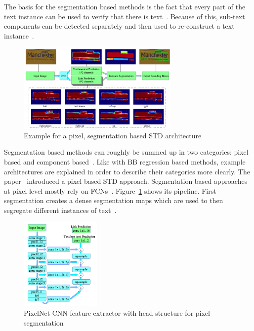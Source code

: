 The basis for the segmentation based methods is the fact that every part of the text instance can
be used to verify that there is text~\citep{long_scene_2021}.
Because of this, sub-text components can be detected separately and then used to re-construct a text
instance~\citep{long_scene_2021}.
\begin{figure}[ht]
    \centering
    \includegraphics[width=0.7\textwidth]{img/STD-seg-based-architecture-Deng-PixelLink-2018.png}
    \caption[Pixel, segmentation based STD architecture]{%
        Example for a pixel, segmentation based STD
        architecture~\citep{deng_pixellink_2018}\label{fig:STD-segbased-pixel-architecture}
    }
\end{figure}
Segmentation based methods can roughly be summed up in two categories: pixel based and component
based~\citep{long_scene_2021}.
Like with \ac{BB} regression based methods, example architectures are explained in order to
describe their categories more clearly.
The paper~\cite{deng_pixellink_2018} introduced a pixel based \ac{STD} approach.
Segmentation based approaches at pixel level mostly rely on \acp{FCN}~\citep{dai_fused_2018}.
Figure~\ref{fig:STD-segbased-pixel-architecture} shows its pipeline.
First segmentation creates a dense segmentation maps which are used to then segregate different
instances of text~\citep{deng_pixellink_2018}.
\begin{figure}[ht]
    \centering
    \includegraphics[width=0.35\textwidth]{img/STD-seg-based-CNN-Deng-PixelLink-2018.png}
    \caption[Feature extractor and prediction head for pixel segmentation]{%
        PixelNet CNN feature extractor with head structure for pixel
        segmentation\label{fig:STD-segbased-pixel-CNN}
    }
\end{figure}
